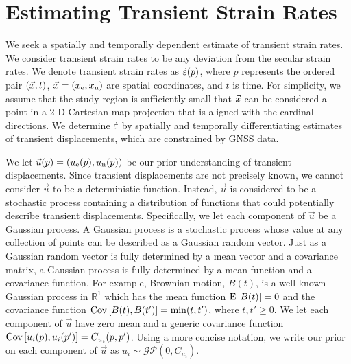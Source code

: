\documentclass[extra,mreferee]{gji}
\begin{document}
\section{Estimating Transient Strain Rates}\label{sec:Method}


We seek a spatially and temporally dependent estimate of transient
strain rates. We consider transient strain rates to be any deviation
from the secular strain rates. We denote transient strain rates as
$\dot\varepsilon(p)$, where $p$ represents the ordered pair $(\vec{x},t)$, $\vec{x}
= (x_{\mathrm{e}},x_{\mathrm{n}})$ are spatial coordinates, and $t$ is time. For
simplicity, we assume that the study region is sufficiently small that
$\vec{x}$ can be considered a point in a 2-D Cartesian map projection
that is aligned with the cardinal directions. We determine $\dot\varepsilon$
by spatially and temporally differentiating estimates of transient
displacements, which are constrained by GNSS data.


We let $\vec{u}(p) = (u_{\mathrm{e}}(p),u_{\mathrm{n}}(p))$ be our prior understanding of
transient displacements. Since transient displacements are not
precisely known, we cannot consider $\vec{u}$ to be a deterministic
function. Instead, $\vec{u}$ is considered to be a stochastic process
containing a distribution of functions that could potentially describe
transient displacements. Specifically, we let each component of
$\vec{u}$ be a Gaussian process. A Gaussian process is a stochastic
process whose value at any collection of points can be described as a
Gaussian random vector. Just as a Gaussian random vector is fully
determined by a mean vector and a covariance matrix, a Gaussian
process is fully determined by a mean function and a covariance
function. For example, Brownian motion, $B(t)$, is a well known
Gaussian process in $\mathbb{R}^1$ which has the mean function
$\mathrm{E}\left[ B(t) \right] = 0$ and the covariance function $\mathrm{Cov}\left[ B(t),B(t') \right] =
\min(t,t')$, where $t,t' \ge 0$. We let each component of $\vec{u}$
have zero mean and a generic covariance function $\mathrm{Cov}\left[ u_i(p),u_i(p') \right]
= C_{u_i}(p,p')$. Using a more concise notation, we write our prior on
each component of $\vec{u}$ as $u_i \sim
\mathcal{GP}\left(0,C_{u_i}\right)$.

\end{document}
